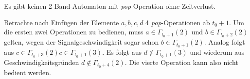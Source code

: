 \documentclass{article}
\begin{document}
\begin{satz}
    Es gibt keinen 2-Band-Automaton mit \emph{pop}-Operation ohne Zeitverlust.
    \begin{beweis}
        Betrachte nach Einfügen der Elemente $a, b, c, d$ 4 \emph{pop}-Operationen ab $t_0+1$. Um die ersten zwei Operationen zu bedienen, muss $a \in \Gamma_{t_0+1}(2)$ und $b \in \Gamma_{t_0+2}(2)$ gelten, wegen der Signalgeschwindigkeit sogar schon $b \in \Gamma_{t_0+1}(2)$. Analog folgt aus $c \in \Gamma_{t_0+3}(2) c \in \Gamma_{t_0+1}(3)$. Es folgt aus  $d \notin \Gamma_{t_0+1}(3)$ und wiederum aus Geschwindigkeitsgründen $d \notin \Gamma_{t_0+4}(2)$. Die vierte Operation kann also nicht bedient werden.
    \end{beweis}
\end{satz}
\end{document}
